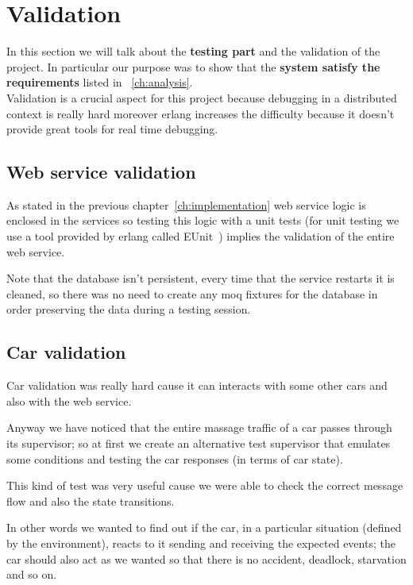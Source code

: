 \chapter{Validation}\label{ch:validation}

In this section we will talk about the \textbf{testing part} and the validation 
of the project. 
In particular our purpose was to show that the \textbf{system satisfy the requirements} 
listed in ~\ref{ch:analysis}. \\

\noindent
Validation is a crucial aspect for this project because debugging in a distributed context 
is really hard moreover erlang increases the difficulty because it doesn't provide 
great tools for real time debugging.


\section{Web service validation}

As stated in the previous chapter~\ref{ch:implementation} web service logic is enclosed in the services 
so testing this logic with a unit tests (for unit testing we use a tool provided by erlang called EUnit~\cite{22})
implies the validation of the entire web service.

Note that the database isn't persistent, every time that the service restarts it is cleaned, 
so there was no need to create any moq fixtures for the database in order preserving the data during a testing session.


\section{Car validation}

Car validation was really hard cause it can interacts with some other cars and also with the 
web service. 

Anyway we have noticed that the entire massage traffic of a car passes 
through its supervisor; so at first we create an alternative test supervisor that 
emulates some conditions and testing the car responses (in terms of car state).

This kind of test was very useful cause we were able to check 
the correct message flow and also the state transitions.

In other words we wanted to find out if the car, in a 
particular situation (defined by the environment), reacts to it sending and receiving 
the expected events; the car should also act as we wanted so that there is no accident, 
deadlock, starvation and so on.


